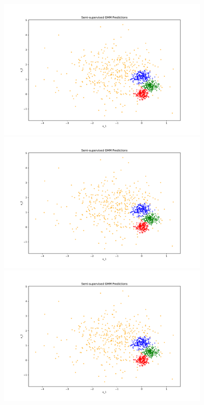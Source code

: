\begin{answer}

\begin{figure} %
   \includegraphics[width=4in]{pred_ss_0.pdf} 
   \includegraphics[width=4in]{pred_ss_1.pdf} 
   \includegraphics[width=4in]{pred_ss_2.pdf} 
\end{figure}

\end{answer}
